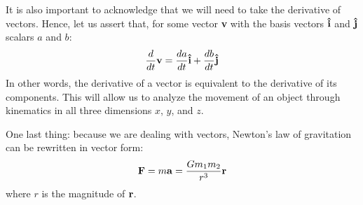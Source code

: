 It is also important to acknowledge that we will need to take the derivative of vectors. Hence, let us assert that, for some vector \textbf{v} with the basis vectors $\uvec{i}$ and $\uvec{j}$ scalars $a$ and $b$:
\begin{equation*}
	\frac{d}{dt}\bvec{v} = \frac{da}{dt}\uvec{i} + \frac{db}{dt}\uvec{j}
\end{equation*}
In other words, the derivative of a vector is equivalent to the derivative of its components.
This will allow us to analyze the movement of an object through kinematics in all three dimensions $x$, $y$, and $z$.

\newpage

One last thing: because we are dealing with vectors, Newton's law of gravitation can be rewritten in vector form:
\begin{equation*}
	\bm{\mathbf{F}} = m\bm{\mathbf{a}} = \frac{Gm_1m_2}{r^3}\bm{\mathbf{r}}
\end{equation*}
where $r$ is the magnitude of $\bm{\mathbf{r}}$.

